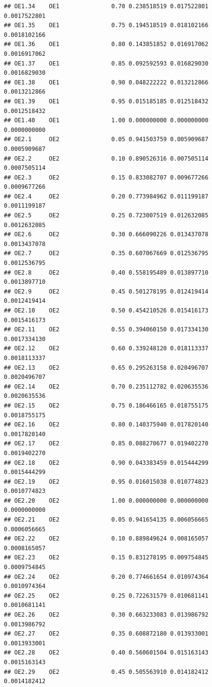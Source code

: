 \documentclass[
]{book}
\begin{document}
\begin{verbatim}
## OE1.34    OE1               0.70 0.238518519 0.017522801 0.0017522801
## OE1.35    OE1               0.75 0.194518519 0.018102166 0.0018102166
## OE1.36    OE1               0.80 0.143851852 0.016917062 0.0016917062
## OE1.37    OE1               0.85 0.092592593 0.016829030 0.0016829030
## OE1.38    OE1               0.90 0.048222222 0.013212866 0.0013212866
## OE1.39    OE1               0.95 0.015185185 0.012518432 0.0012518432
## OE1.40    OE1               1.00 0.000000000 0.000000000 0.0000000000
## OE2.1     OE2               0.05 0.941503759 0.005909687 0.0005909687
## OE2.2     OE2               0.10 0.890526316 0.007505114 0.0007505114
## OE2.3     OE2               0.15 0.833082707 0.009677266 0.0009677266
## OE2.4     OE2               0.20 0.773984962 0.011199187 0.0011199187
## OE2.5     OE2               0.25 0.723007519 0.012632085 0.0012632085
## OE2.6     OE2               0.30 0.666090226 0.013437078 0.0013437078
## OE2.7     OE2               0.35 0.607067669 0.012536795 0.0012536795
## OE2.8     OE2               0.40 0.558195489 0.013897710 0.0013897710
## OE2.9     OE2               0.45 0.501278195 0.012419414 0.0012419414
## OE2.10    OE2               0.50 0.454210526 0.015416173 0.0015416173
## OE2.11    OE2               0.55 0.394060150 0.017334130 0.0017334130
## OE2.12    OE2               0.60 0.339248120 0.018113337 0.0018113337
## OE2.13    OE2               0.65 0.295263158 0.020496707 0.0020496707
## OE2.14    OE2               0.70 0.235112782 0.020635536 0.0020635536
## OE2.15    OE2               0.75 0.186466165 0.018755175 0.0018755175
## OE2.16    OE2               0.80 0.140375940 0.017820140 0.0017820140
## OE2.17    OE2               0.85 0.088270677 0.019402270 0.0019402270
## OE2.18    OE2               0.90 0.043383459 0.015444299 0.0015444299
## OE2.19    OE2               0.95 0.016015038 0.010774823 0.0010774823
## OE2.20    OE2               1.00 0.000000000 0.000000000 0.0000000000
## OE2.21    OE2               0.05 0.941654135 0.006056665 0.0006056665
## OE2.22    OE2               0.10 0.889849624 0.008165057 0.0008165057
## OE2.23    OE2               0.15 0.831278195 0.009754845 0.0009754845
## OE2.24    OE2               0.20 0.774661654 0.010974364 0.0010974364
## OE2.25    OE2               0.25 0.722631579 0.010681141 0.0010681141
## OE2.26    OE2               0.30 0.663233083 0.013986792 0.0013986792
## OE2.27    OE2               0.35 0.608872180 0.013933001 0.0013933001
## OE2.28    OE2               0.40 0.560601504 0.015163143 0.0015163143
## OE2.29    OE2               0.45 0.505563910 0.014182412 0.0014182412

\end{verbatim}
\end{document}
